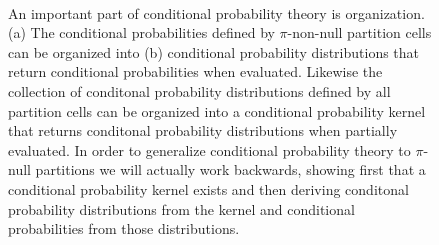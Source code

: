 \documentclass[
  letterpaper,
  DIV=11,
  numbers=noendperiod]{scrartcl}
\begin{document}
\begin{figure}
\begin{minipage}{0.30\linewidth}
{}

\subcaption{\label{fig-conditional-organization-distributions}}

\end{minipage}%
%
\begin{minipage}{0.30\linewidth}


\subcaption{\label{fig-conditional-organization-kernel}}

\end{minipage}%
%
\begin{minipage}{0.05\linewidth}
~\end{minipage}%

\caption{\label{fig-conditional-organization}An important part of
conditional probability theory is organization. (a) The conditional
probabilities defined by \(\pi\)-non-null partition cells can be
organized into (b) conditional probability distributions that return
conditional probabilities when evaluated. Likewise the collection of
conditonal probability distributions defined by all partition cells can
be organized into a conditional probability kernel that returns
conditonal probability distributions when partially evaluated. In order
to generalize conditional probability theory to \(\pi\)-null partitions
we will actually work backwards, showing first that a conditional
probability kernel exists and then deriving conditonal probability
distributions from the kernel and conditional probabilities from those
distributions.}

\end{figure}%
\end{document}
